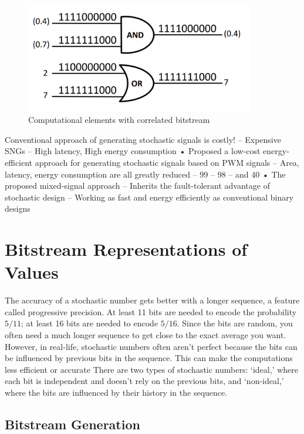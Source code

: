 \begin{figure}[htb]
	\includegraphics[width=10cm]{gfx/maxmin.png}
	\caption{Computational elements with correlated bitstream}
	\label{fig:system:example1}
\end{figure}




Conventional approach of generating stochastic signals is costly!
– Expensive SNGs
– High latency, High energy consumption
• Proposed a low-cost energy-efficient approach for generating
stochastic signals based on PWM signals
– Area, latency, energy consumption are all greatly reduced
– 99%
– 98%
– and 40%
• The proposed mixed-signal approach
– Inherits the fault-tolerant advantage of stochastic design
– Working as fast and energy efficiently as conventional binary designs

\section{Bitstream Representations of Values}
\label{sec:review:sec2}

The accuracy of a stochastic number gets better with a longer sequence, a
feature called progressive precision. At least 11 bits are needed to encode the
probability $5/11$; at least 16 bits are needed to encode $5/16$. Since the
bits are random, you often need a much longer sequence to get close to the exact
average you want. However, in real-life, stochastic numbers often aren't perfect
because the bits can be influenced by previous bits in the sequence. This can
make the computations less efficient or accurate There are two types of
stochastic numbers: `ideal,' where each bit is independent and doesn't rely on
the previous bits, and `non-ideal,' where the bits are influenced by their
history in the sequence.



\subsection{Bitstream Generation}


